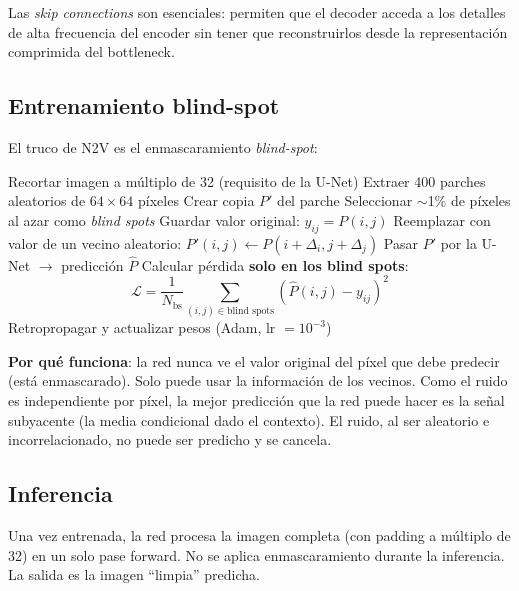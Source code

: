 \documentclass[11pt,a4paper]{article}
\begin{document}
Las \textit{skip connections} son esenciales: permiten que el decoder acceda a los detalles de alta frecuencia del encoder sin tener que reconstruirlos desde la representaci\'{o}n comprimida del bottleneck.

\subsection{Entrenamiento blind-spot}

El truco de N2V es el enmascaramiento \textit{blind-spot}:

\begin{algorithm}[H]
\caption{Entrenamiento Noise2Void}
\begin{algorithmic}[1]
\State Recortar imagen a m\'{u}ltiplo de 32 (requisito de la U-Net)
\State Extraer 400 parches aleatorios de $64 \times 64$ p\'{i}xeles
    \State Crear copia $P'$ del parche
    \State Seleccionar $\sim$1\% de p\'{i}xeles al azar como \textit{blind spots}
      \State Guardar valor original: $y_{ij} = P(i,j)$
      \State Reemplazar con valor de un vecino aleatorio: $P'(i,j) \leftarrow P(i + \Delta_i, j + \Delta_j)$
    \EndFor
    \State Pasar $P'$ por la U-Net $\to$ predicci\'{o}n $\hat{P}$
    \State Calcular p\'{e}rdida \textbf{solo en los blind spots}:
    \begin{equation}
      \mathcal{L} = \frac{1}{N_{\text{bs}}} \sum_{(i,j) \in \text{blind spots}} \left( \hat{P}(i,j) - y_{ij} \right)^2
    \end{equation}
    \State Retropropagar y actualizar pesos (Adam, lr $= 10^{-3}$)
  \EndFor
\EndFor
\end{algorithmic}
\end{algorithm}

\textbf{Por qu\'{e} funciona}: la red nunca ve el valor original del p\'{i}xel que debe predecir (est\'{a} enmascarado). Solo puede usar la informaci\'{o}n de los vecinos. Como el ruido es independiente por p\'{i}xel, la mejor predicci\'{o}n que la red puede hacer es la se\~{n}al subyacente (la media condicional dado el contexto). El ruido, al ser aleatorio e incorrelacionado, no puede ser predicho y se cancela.

\subsection{Inferencia}

Una vez entrenada, la red procesa la imagen completa (con padding a m\'{u}ltiplo de 32) en un solo pase forward. No se aplica enmascaramiento durante la inferencia. La salida es la imagen ``limpia'' predicha.
\end{document}
